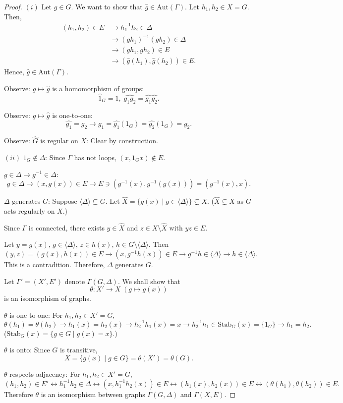 \documentclass[
]{book}
\theoremstyle{definition}
\theoremstyle{definition}
\theoremstyle{definition}
\theoremstyle{definition}
\theoremstyle{remark}
\begin{document}
\begin{proof}
\((i)\) Let \(g\in G\). We want to show that \(\hat{g}\in \mathrm{Aut}(\Gamma)\). Let \(h_1, h_2\in X = G\). Then,
\begin{align}
(h_1, h_2)\in E & \to h_1^{-1}h_2\in \Delta\\
  & \to (gh_1)^{-1}(gh_2)\in \Delta \\
  & \to (gh_1, gh_2)\in E\\
  & \to (\hat{g}(h_1), \hat{g}(h_2)) \in E.
\end{align}
Hence, \(\hat{g}\in \mathrm{Aut}(\Gamma)\).

Observe: \(g \mapsto \hat{g}\) is a homomorphism of groups:
\[\hat{1}_G = 1, \; \widehat{g_1g_2} = \widehat{g_1}\widehat{g_2}.\]

Observe: \(g \mapsto \hat{g}\) is one-to-one:
\[\widehat{g_1} = \widehat{g_2} \to g_1 = \widehat{g_1}(1_G) = \widehat{g_2}(1_G) = g_2.\]

Observe: \(\hat{G}\) is regular on \(X\): Clear by construction.

\((ii)\) \(1_G\not\in \Delta\): Since \(\Gamma\) has not loops, \((x, 1_Gx) \not\in E\).

\(g\in \Delta \to g^{-1}\in \Delta\):
\[g\in \Delta \to (x, g(x))\in E \to E \ni (g^{-1}(x), g^{-1}(g(x))) = (g^{-1}(x), x).\]

\(\Delta\) generates \(G\): Suppose \(\langle \Delta \rangle \subsetneq G\). Let \(\hat{X} = \{g(x)\mid g\in \langle \Delta\rangle\} \subsetneq X\). (\(\hat{X} \subsetneq X\) as \(G\) acts regularly on \(X\).)

Since \(\Gamma\) is connected, there exists \(y\in \hat{X}\) and \(z\in X\setminus \hat{X}\) with \(yz\in E\).

Let \(y = g(x)\), \(g\in \langle \Delta\rangle\), \(z\in h(x)\), \(h\in G\setminus \langle \Delta\rangle\). Then
\[(y,z)=(g(x),h(x))\in E \to (x,g^{-1}h(x))\in E \to g^{-1}h\in \langle \Delta \rangle \to h\in \langle \Delta \rangle. \]
This is a contradition. Therefore, \(\Delta\) generates \(G\).

Let \(\Gamma' = (X', E')\) denote \(\Gamma(G, \Delta)\). We shall show that
\[\theta: X' \to X \; (g\mapsto g(x))\]
is an isomorphism of graphs.

\(\theta\) is one-to-one: For \(h_1, h_2\in X' = G\),
\[\theta(h_1)=\theta(h_2) \to h_1(x) = h_2(x) \to h_2^{-1}h_1(x)=x \to h_2^{-1}h_1\in \mathrm{Stab}_G(x) = \{1_G\} \to h_1 = h_2.\]
(\(\mathrm{Stab}_G(x) = \{g\in G\mid g(x) = x\}\).)

\(\theta\) is onto: Since \(G\) is transitive,
\[X = \{g(x)\mid g\in G\} = \theta(X') = \theta(G).\]

\(\theta\) respects adjacency: For \(h_1, h_2\in X' = G\),
\[(h_1,h_2)\in E' \leftrightarrow h_1^{-1}h_2\in \Delta \leftrightarrow (x, h_1^{-1}h_2(x))\in E \leftrightarrow (h_1(x),h_2(x))\in E \leftrightarrow (\theta(h_1), \theta(h_2))\in E.\]
Therefore \(\theta\) is an isomorphism between graphs \(\Gamma(G, \Delta)\) and \(\Gamma(X, E)\).
\end{proof}
\end{document}
